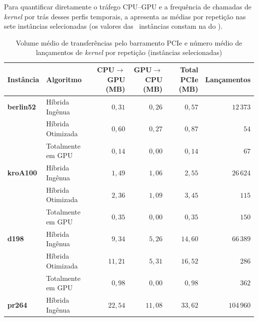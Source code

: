 Para quantificar diretamente o tráfego CPU--GPU e a frequência de chamadas de \emph{kernel} por trás desses perfis temporais, a  apresenta as médias por repetição nas sete instâncias selecionadas (os valores das \totalinstancias\ instâncias constam na  do ).

\begin{table}[htbp]
  \centering
  \caption{Volume médio de transferências pelo barramento PCIe e número médio de lançamentos de \emph{kernel} por repetição (instâncias selecionadas)}\label{tbl:transfers-launches}
  \begin{tabeladensa}
    \begin{tabular}{@{}llrrrr@{}}
      \toprule
      Instância         & Algoritmo         & CPU\(\to\)GPU (MB) & GPU\(\to\)CPU (MB) & Total PCIe (MB) & Lançamentos     \\
      \midrule
      \textbf{berlin52} & Híbrida Ingênua   & \(0{,}31\)         & \(0{,}26\)         & \(0{,}57\)      & \(12\,373\)     \\
                        & Híbrida Otimizada & \(0{,}60\)         & \(0{,}27\)         & \(0{,}87\)      & \(54\)          \\
                        & Totalmente em GPU & \(0{,}14\)         & \(0{,}00\)         & \(0{,}14\)      & \(67\)          \\
      \midrule
      \textbf{kroA100}  & Híbrida Ingênua   & \(1{,}49\)         & \(1{,}06\)         & \(2{,}55\)      & \(26\,624\)     \\
                        & Híbrida Otimizada & \(2{,}36\)         & \(1{,}09\)         & \(3{,}45\)      & \(115\)         \\
                        & Totalmente em GPU & \(0{,}35\)         & \(0{,}00\)         & \(0{,}35\)      & \(150\)         \\
      \midrule
      \textbf{d198}     & Híbrida Ingênua   & \(9{,}34\)         & \(5{,}26\)         & \(14{,}60\)     & \(66\,389\)     \\
                        & Híbrida Otimizada & \(11{,}21\)        & \(5{,}31\)         & \(16{,}52\)     & \(286\)         \\
                        & Totalmente em GPU & \(0{,}98\)         & \(0{,}00\)         & \(0{,}98\)      & \(362\)         \\
      \midrule
      \textbf{pr264}    & Híbrida Ingênua   & \(22{,}54\)        & \(11{,}08\)        & \(33{,}62\)     & \(104\,960\)    \\

\end{tabular}
\end{tabeladensa}
\end{table}
